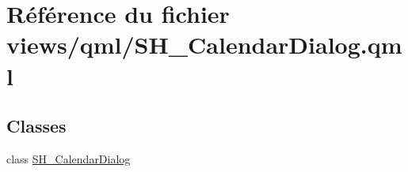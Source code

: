 \hypertarget{SH__CalendarDialog_8qml}{\section{Référence du fichier views/qml/\-S\-H\-\_\-\-Calendar\-Dialog.qml}
\label{SH__CalendarDialog_8qml}
}
\subsection*{Classes}
\begin{DoxyCompactItemize}
\item 
class \hyperlink{classSH__CalendarDialog}{S\-H\-\_\-\-Calendar\-Dialog}
\end{DoxyCompactItemize}
